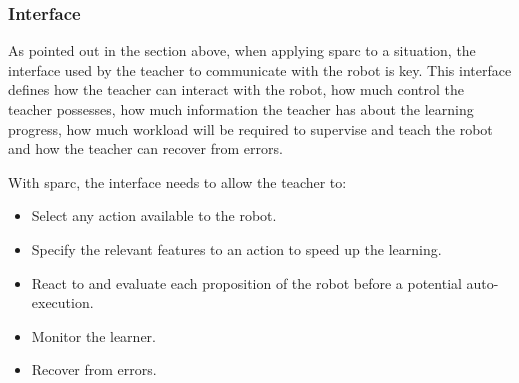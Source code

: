 %
%
\subsubsection{Interface} \label{sec:tuto_interface}

As pointed out in the section above, when applying \gls{sparc} to a situation, the interface used by the teacher to communicate with the robot is key. This interface defines how the teacher can interact with the robot, how much control the teacher possesses, how much information the teacher has about the learning progress, how much workload will be required to supervise and teach the robot and how the teacher can recover from errors.

With \gls{sparc}, the interface needs to allow the teacher to:
\begin{itemize}
	\item Select any action available to the robot.
	\item Specify the relevant features to an action to speed up the learning.
	\item React to and evaluate each proposition of the robot before a potential auto-execution.
	\item Monitor the learner.
	\item Recover from errors.
\end{itemize}


